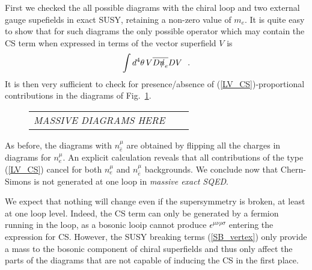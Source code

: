 \documentclass[12pt]{revtex4}
\newcommand{\slashed}[1]{\hbox{{$#1$}\llap{$/$}}}
\begin{document}
First we checked the all possible diagrams with the chiral loop and two 
  external gauge supefields in exact SUSY, retaining a non-zero value of $m_e$. 
It is quite easy to show that for such diagrams the only possible operator 
which may contain the CS term when expressed in terms
of the vector superfield $ V $ is
\begin{equation}
\label{LV_CS}
\int d^4\theta \, V \overline{D\slashed{n}_e}D V~~.
\end{equation}
        It is then very sufficient to check for presence/absence of (\ref{LV_CS})-proportional
contributions in the diagrams of Fig.~\ref{diag_gauge_massive}.
\begin{figure}[h]
 \caption{\label{diag_gauge_massive}}
\begin{center}
\begin{tabular}{ccc}
\emph{MASSIVE DIAGRAMS HERE}
\end{tabular}
\end{center}
\end{figure}
As before, the diagrams with $ n_{\bar{e}}^\mu $
are obtained by flipping all the charges in diagrams for $ n_{e}^\mu $.
An explicit calculation reveals that all contributions of the type
(\ref{LV_CS}) cancel for both $n^\mu_e$ and $n^\mu_{\bar e}$ backgrounds. 
We conclude now that Chern-Simons is not generated at one loop
in {\it massive exact SQED}.


We expect that nothing will change even if the supersymmetry is broken, at least at one loop level.
    Indeed, the CS term can only be generated by a fermion running in
the loop, as a bosonic looip cannot produce 
$ \epsilon^{\mu\nu\rho\sigma} $ entering the expression for CS.
However, the SUSY breaking terms (\ref{SB_vertex}) only 
provide a mass to the bosonic component of chiral superfields
and thus only affect the parts of the diagrams that are not 
capable of inducing the CS in the first place. 
\end{document}
